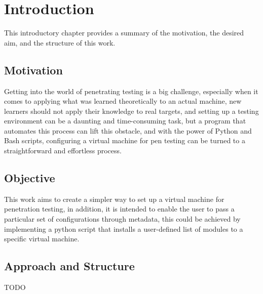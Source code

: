 \chapter{Introduction}
This introductory chapter provides a summary of the motivation, the desired aim, and the structure of this work.

\section{Motivation}
Getting into the world of penetrating testing is a big challenge, especially when it comes to applying what was learned theoretically to an actual machine, new learners should not apply their knowledge to real targets, and setting up a testing environment can be a daunting and time-consuming task, but a program that automates this process can lift this obstacle, and with the power of Python and Bash scripts, configuring a virtual machine for pen testing can be turned to a straightforward and effortless process.

\section{Objective}
This work aims to create a simpler way to set up a virtual machine for penetration testing, in addition, it is intended to enable the user to pass a particular set of configurations through metadata, this could be achieved by implementing a python script that installs a user-defined list of modules to a specific virtual machine.

\section{Approach and Structure}
TODO
